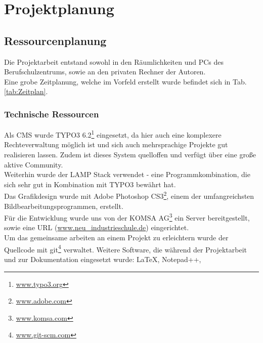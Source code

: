 \section{Projektplanung} 
\label{sec:Projektplanung}

\subsection{Ressourcenplanung}
\label{sec:Ressourcenplanung}
Die Projektarbeit entstand sowohl in den Räumlichkeiten und PCs 
des Berufschulzentrums, sowie an den privaten Rechner der Autoren.\\
Eine grobe Zeitplanung, welche im Vorfeld erstellt wurde befindet sich in Tab. \ref{tab:Zeitplan}.

\subsubsection{Technische Ressourcen}
\label{sec:TechnischeRessourcen}
Als \acs{CMS} wurde TYPO3 6.2\footnote{\href{www.typo3.org}{www.typo3.org}} 
eingesetzt, da hier auch eine komplexere 
Rechteverwaltung möglich ist und sich auch mehrsprachige Projekte
gut realisieren lassen. Zudem ist dieses System quelloffen und verfügt
über eine große aktive Community.\\
Weiterhin wurde der \acs{LAMP Stack} verwendet - eine Programmkombination, 
die sich sehr gut in Kombination mit TYPO3 bewährt hat.\\
Das Grafikdesign wurde mit Adobe Photoshop 
CS3\footnote{\href{http://www.adobe.com/de/products/photoshop.html}{www.adobe.com}}, 
einem der umfangreichsten Bildbearbeitungsprogrammen, erstellt.\\
Für die Entwicklung wurde uns von der KOMSA AG\footnote{\href{https://komsa.com/de/start/}{www.komsa.com}}
ein Server bereitgestellt, sowie eine \acs{URL} (\url{www.neu_industrieschule.de}) eingerichtet.\\
Um das gemeinsame arbeiten an einem Projekt zu erleichtern wurde der Quellcode mit 
git\footnote{\href{https://git-scm.com/}{www.git-scm.com}} verwaltet.
Weitere Software, die während der Projektarbeit und zur Dokumentation eingesetzt wurde: \LaTeX, Notepad++, 

